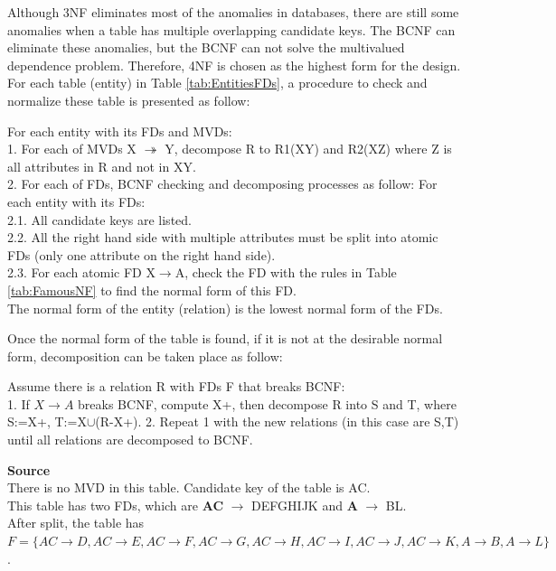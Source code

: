 Although 3NF eliminates most of the anomalies in databases, there are still some anomalies when a table has multiple overlapping candidate keys. The BCNF can eliminate these anomalies, but the BCNF can not solve the multivalued dependence problem. Therefore, 4NF is chosen as the highest form for the design. For each table (entity) in Table \ref{tab:EntitiesFDs}, a procedure to check and normalize these table is presented as follow\cite{INF3100_Recipe_book}:
\begin{adjustwidth}{1cm}{}
For each entity with its FDs and MVDs:\\
1. For each of MVDs X $\twoheadrightarrow$ Y, decompose R to R1(XY) and R2(XZ) where Z is all attributes in R and not in XY.\\
2. For each of FDs, BCNF checking and decomposing processes as follow\cite{INF3100_Recipe_book}:
For each entity with its FDs:\\
2.1. All candidate keys are listed.\\
2.2. All the right hand side with multiple attributes must be split into atomic FDs (only one attribute on the right hand side).\\
2.3. For each atomic FD X$\rightarrow$A, check the FD with the rules in Table \ref{tab:FamousNF} to find the normal form of this FD.\\
The normal form of the entity (relation) is the lowest normal form of the FDs.
\end{adjustwidth}
Once the normal form of the table is found, if it is not at the desirable normal form, decomposition can be taken place as follow\cite{INF3100_Recipe_book}:
\begin{adjustwidth}{1cm}{}
Assume there is a relation R with FDs F that breaks BCNF:\\
1. If $X \rightarrow A$ breaks BCNF, compute X+, then decompose R into S and T, where S:=X+, T:=X$\cup$(R-X+).
2. Repeat 1 with the new relations (in this case are S,T) until all relations are decomposed to BCNF.
\end{adjustwidth}
\textbf{Source}\\
There is no MVD in this table. Candidate key of the table is AC.\\
This table has two FDs, which are \textbf{AC} $\rightarrow$ DEFGHIJK and \textbf{A} $\rightarrow$ BL.\\
After split, the table has $F=\{AC \rightarrow D, AC \rightarrow E, AC \rightarrow F, AC \rightarrow G, AC \rightarrow H, AC \rightarrow I, AC \rightarrow J, AC \rightarrow K, A \rightarrow B, A \rightarrow L\}$.

